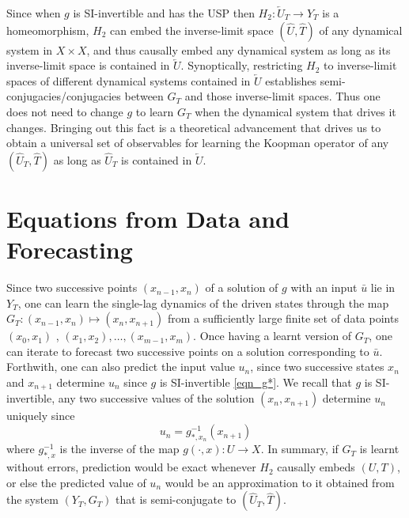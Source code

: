 \documentclass[12 pt]{article}
\begin{document}
Since when $g$ is SI-invertible and has the USP then $H_2: \overleftarrow{U}_T \to Y_T$  is a homeomorphism, $H_2$ can embed the inverse-limit space $(\widehat{U}, \widehat{T})$ of any dynamical system in $X \times X$, and thus causally embed any dynamical system as long as its inverse-limit space is contained in $\overleftarrow{U}$. 
Synoptically,  restricting $H_2$ to inverse-limit spaces of different dynamical systems contained in $\overleftarrow{U}$ establishes semi-conjugacies/conjugacies  between  $G_T$ and those inverse-limit spaces. 
 Thus one does not need to change $g$ to learn $G_T$ when the dynamical system that drives it changes.  Bringing out this fact is a theoretical advancement that drives us to obtain a universal set of observables for learning the Koopman operator \cite{koopman1932dynamical} of any $(\widehat{U}_T, \widehat{T})$ as long as $\widehat{U}_T$ is contained in $\overleftarrow{U}$.



\section{Equations from Data and Forecasting}

Since two successive points $(x_{n-1},x_n)$ of a solution of $g$ with an input $\bar{u}$ lie in $Y_T$, one can learn the single-lag dynamics of the driven states through the map $G_T: (x_{n-1},x_{n}) \mapsto (x_n,x_{n+1})$ from a sufficiently large finite set of data points $(x_0,x_1)$ , $(x_1,x_2), \ldots, (x_{m-1},x_m)$. Once having a learnt version of $G_T$, one can iterate  to forecast two successive points on a solution corresponding to $\bar{u}$.  Forthwith, one can also predict the input value $u_n$, since two successive states $x_n$ and $x_{n+1}$ determine $u_n$ since $g$ is SI-invertible \eqref{eqn_g*}. We recall that $g$ is SI-invertible,  any two successive values of the solution $(x_n,x_{n+1})$  determine $u_n$ uniquely since \begin{equation} \label{eqn_g*}
u_n=g_{*,x_{n}}^{-1}(x_{n+1})
\end{equation}
where  $g_{*,x}^{-1}$ is the inverse of the map $g(\cdot,x):U \to X$. 
In summary, if $G_T$ is learnt without errors, prediction would be exact whenever $H_2$ causally embeds $(U,T)$, or else the predicted value of $u_n$ would be an approximation to it obtained from the system $(Y_T,G_T)$ that is semi-conjugate to $(\widehat{U}_T,\widehat{T})$.  
\end{document}
